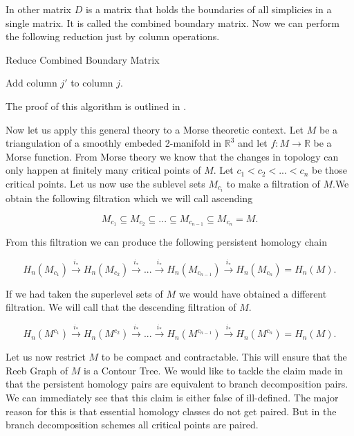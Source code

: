 In other matrix $D$ is a matrix that holds the boundaries of all simplicies in a single matrix. It is called the combined boundary matrix. Now we can perform the following reduction just by column operations.


\begin{algorithm}
\caption{Reduce Combined Boundary Matrix}

\begin{algorithmic}[1]


        \State Add column $j'$ to column $j$.
    \EndWhile
\EndFor

\end{algorithmic}
\end{algorithm}

The proof of this algorithm is outlined in \cite{persistence-original}.

Now let us apply this general theory to a Morse theoretic context. Let $M$ be a triangulation of a smoothly embeded 2-manifold in $\mathbb{R}^3$ and let $f : M \to \mathbb{R}$ be a Morse function. From Morse theory we know that the changes in topology can only happen at finitely many critical points of $M$. Let $c_1 < c_2 < ... < c_n$ be those critical points. Let us now use the sublevel sets $M_{c_i}$  to make a filtration of $M$.We obtain the following filtration which we will call ascending

$$ M_{c_1} \subseteq M_{c_2} \subseteq ... \subseteq M_{c_{n-1}} \subseteq M_{c_n} = M.$$

From this filtration we can produce the following persistent homology chain

$$ H_n(M_{c_1}) \overset{i_*}{\longrightarrow} H_n(M_{c_2}) \overset{i_*}{\longrightarrow} ... \overset{i_*}{\longrightarrow} H_n(M_{c_{n-1}}) \overset{i_*}{\longrightarrow} H_n(M_{c_n}) = H_n(M).$$

If we had taken the superlevel sets of $M$ we would have obtained a different filtration. We will call that the descending filtration of $M$.

$$ H_n(M^{c_1}) \overset{i_*}{\longrightarrow} H_n(M^{c_2}) \overset{i_*}{\longrightarrow} ... \overset{i_*}{\longrightarrow} H_n(M^{c_{n-1}}) \overset{i_*}{\longrightarrow} H_n(M^{c_n}) = H_n(M).$$


Let us now restrict $M$ to be compact and contractable. This will ensure that the Reeb Graph of $M$ is a Contour Tree. We would like to tackle the claim made in \cite{ct-branch-decomp} that the persistent homology pairs are equivalent to branch decomposition pairs. We can immediately see that this claim is either false of ill-defined. The major reason for this is that essential homology classes do not get paired. But in the branch decomposition schemes all critical points are paired.

